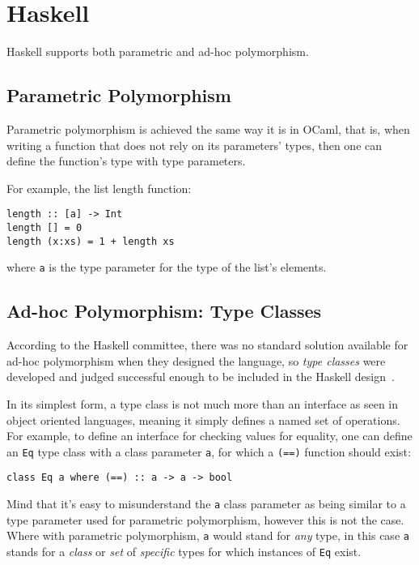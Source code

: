 \section{Haskell}

Haskell supports both parametric and ad-hoc polymorphism.

\subsection{Parametric Polymorphism}

Parametric polymorphism is achieved the same way it is in OCaml, that is, when writing a function that does not rely on its parameters' types, then one can define the function's type with type parameters.

For example, the list length function:
\begin{verbatim}
length :: [a] -> Int
length [] = 0
length (x:xs) = 1 + length xs
\end{verbatim}
where \verb|a| is the type parameter for the type of the list's elements.

\subsection{Ad-hoc Polymorphism: Type Classes}\label{haskell-type-classes}

According to the Haskell committee, there was no standard solution available for ad-hoc polymorphism when they designed the language, so \emph{type classes} were developed and judged successful enough to be included in the Haskell design~\cite{type-classes-original}.

In its simplest form, a type class is not much more than an interface as seen in object oriented languages, meaning it simply defines a named set of operations. For example, to define an interface for checking values for equality, one can define an \verb|Eq| type class with a class parameter \verb|a|, for which a \verb|(==)| function should exist:
\begin{verbatim}
class Eq a where (==) :: a -> a -> bool
\end{verbatim}
Mind that it's easy to misunderstand the \verb|a| class parameter as being similar to a type parameter used for parametric polymorphism, however this is not the case. Where with parametric polymorphism, \verb|a| would stand for \emph{any} type, in this case \verb|a| stands for a \emph{class} or \emph{set} of \emph{specific} types for which instances of \verb|Eq| exist.

